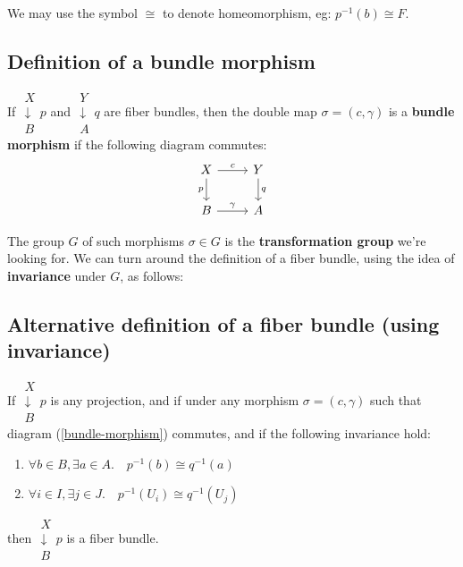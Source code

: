 \begin{preview}
\begin{minipage}{\textwidth}
We may use the symbol $\cong$ to denote homeomorphism, eg:  $p^{-1}(b) \cong F$.

\subsection{Definition of a bundle morphism}

If $\mathrel{\substack{X\\\downarrow \\B}  {\scriptstyle p}}$ and $\mathrel{\substack{Y\\\downarrow \\A}  {\scriptstyle q}}$ are fiber bundles, then the double map $\sigma = (c,\gamma)$ is a \textbf{bundle morphism} if the following diagram commutes:
\begin{equation}
\begin{tikzcd}[]
	X \arrow[r,"c"] \arrow[d,"p", swap] & Y \arrow[d,"q"] \\
	B \arrow[r,"\gamma"] & A
\end{tikzcd}
\label{bundle-morphism}
\end{equation}

The group $G$ of such morphisms $\sigma \in G$ is the \textbf{transformation group} we're looking for.  We can turn around the definition of a fiber bundle, using the idea of \textbf{invariance} under $G$, as follows:

\subsection{Alternative definition of a fiber bundle (using invariance)}

If $\mathrel{\substack{X\\\downarrow \\B}  {\scriptstyle p}}$ is any projection, and if under any morphism $\sigma = (c,\gamma)$ such that diagram (\ref{bundle-morphism}) commutes, and if the following invariance hold:

\begin{enumerate}[label=(\roman*)]
	\item $\forall b \in B, \exists a \in A. \quad p^{-1}(b) \cong q^{-1}(a) $
	
	\item $\forall i \in I, \exists j \in J. \quad p^{-1}(U_i) \cong q^{-1}(U_j) $
\end{enumerate}
then $\mathrel{\substack{X\\\downarrow \\B}  {\scriptstyle p}}$ is a fiber bundle.


\end{minipage}
\end{preview}
